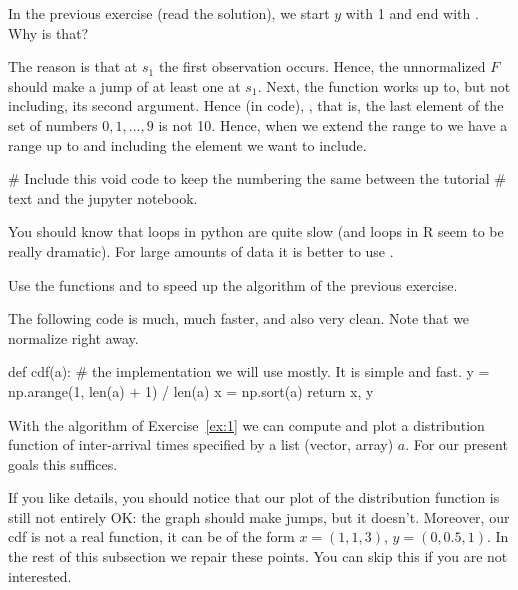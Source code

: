 \begin{exercise}
In the previous exercise (read the solution), we start $y$ with 1 and end with . Why is that?
\begin{solution}
    The reason is that at $s_1$ the first observation occurs. Hence, the unnormalized $F$ should make a jump of at least one at $s_1$. Next, the  function works up to, but not including, its second argument. Hence (in code), , that is, the last element  of the set of numbers $0, 1, \ldots, 9$ is not 10. Hence, when we extend the range to  we have a range up to and including the element we want to include.

  \begin{pyverbatim}
    # Include this void code to keep the numbering the same between the tutorial
    # text and the jupyter notebook.
\end{pyverbatim}

  \end{solution}
\end{exercise}

You should know that  loops in python are quite slow (and  loops in R seem to be really dramatic). For large amounts of data it is better to use .


\begin{exercise}\label{ex:1}
  Use the  functions  and  to speed up the algorithm of the previous exercise.
\begin{solution}
    The following code is much, much faster, and also very clean. Note that we normalize  right away.

\begin{pyverbatim}
def cdf(a):  # the implementation we will use mostly. It is simple and fast.
    y = np.arange(1, len(a) + 1) / len(a)
    x = np.sort(a)
    return x, y
\end{pyverbatim}
  \end{solution}
\end{exercise}


With the algorithm of Exercise~\ref{ex:1} we can compute and plot a distribution function of inter-arrival times specified by a list (vector, array) $a$.
For our present goals this suffices.

If you like details, you should notice that our plot of the distribution function is still not entirely OK: the graph should make jumps, but it doesn't.
Moreover, our cdf is not a real function, it can be of the form $x=(1,1,3)$, $y=(0, 0.5, 1)$.
In the rest of this subsection we repair these points.
You can skip this if you are not interested.

